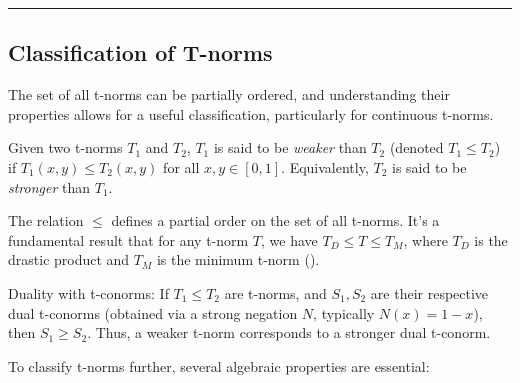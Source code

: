 \noindent\rule{\textwidth}{2pt}


\subsection{Classification of T-norms}


The set of all t-norms can be partially ordered, and understanding their properties allows for a useful classification, particularly for continuous t-norms.

\begin{definition}
  Given two t-norms $T_1$ and $T_2$, $T_1$ is said to be \emph{weaker} than $T_2$ (denoted $T_1 \leq T_2$) if $T_1(x,y) \leq T_2(x,y)$ for all $x,y \in [0,1]$.
  Equivalently, $T_2$ is said to be \emph{stronger} than $T_1$.
\end{definition}

\begin{remark}
  The relation $\leq$ defines a partial order on the set of all t-norms.
  It's a fundamental result that for any t-norm $T$, we have $T_D \leq T \leq T_M$, where $T_D$ is the drastic product and $T_M$ is the minimum t-norm (\citep[Remark 1.5(i), p.~21]{Klement2000}).
\end{remark}

\begin{remark}
  Duality with t-conorms: If $T_1 \leq T_2$ are t-norms, and $S_1, S_2$ are their respective dual t-conorms (obtained via a strong negation $N$, typically $N(x)=1-x$), then $S_1 \geq S_2$. Thus, a weaker t-norm corresponds to a stronger dual t-conorm.
\end{remark}

To classify t-norms further, several algebraic properties are essential:


